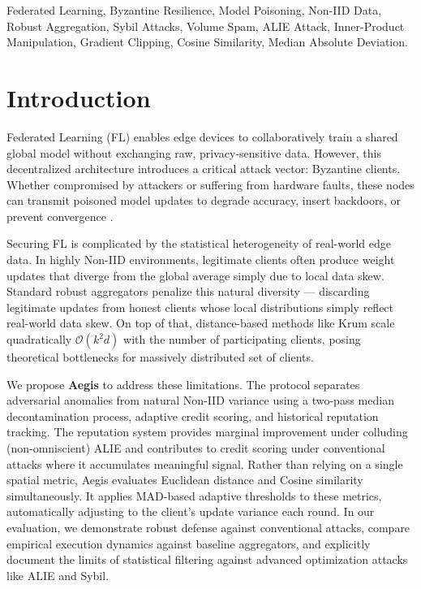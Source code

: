 \documentclass[10pt, conference]{IEEEtran}
\begin{document}
\begin{IEEEkeywords}
Federated Learning, Byzantine Resilience, Model Poisoning, Non-IID Data, Robust Aggregation, Sybil Attacks, Volume Spam, ALIE Attack, Inner-Product Manipulation, Gradient Clipping, Cosine Similarity, Median Absolute Deviation.
\end{IEEEkeywords}

\section{Introduction}
Federated Learning (FL) enables edge devices to collaboratively train a shared global model without exchanging raw, privacy-sensitive data. However, this decentralized architecture introduces a critical attack vector: Byzantine clients. Whether compromised by attackers or suffering from hardware faults, these nodes can transmit poisoned model updates to degrade accuracy, insert backdoors, or prevent convergence \cite{blanchard2017}.

Securing FL is complicated by the statistical heterogeneity of real-world edge data. In highly Non-IID environments, legitimate clients often produce weight updates that diverge from the global average simply due to local data skew. Standard robust aggregators penalize this natural diversity — discarding legitimate updates from honest clients whose local distributions simply reflect real-world data skew. On top of that, distance-based methods like Krum scale quadratically $\mathcal{O}(k^2 d)$ with the number of participating clients, posing theoretical bottlenecks for massively distributed set of clients.

We propose \textbf{Aegis} to address these limitations. The protocol separates adversarial anomalies from natural Non-IID variance using a two-pass median decontamination process, adaptive credit scoring, and historical reputation tracking. The reputation system provides marginal improvement under colluding (non-omniscient) ALIE and contributes to credit scoring under conventional attacks where it accumulates meaningful signal. Rather than relying on a single spatial metric, Aegis evaluates Euclidean distance and Cosine similarity simultaneously. It applies MAD-based adaptive thresholds to these metrics, automatically adjusting to the client's update variance each round. In our evaluation, we demonstrate robust defense against conventional attacks, compare empirical execution dynamics against baseline aggregators, and explicitly document the limits of statistical filtering against advanced optimization attacks like ALIE and Sybil.
\end{document}
